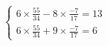\documentclass[preview]{standalone}
\begin{document}
\begin{align*}
\left\{ \begin{array}{cl} 6\times\frac{55}{34} - 8\times\frac{-7}{17} = 13 \\[1pt] 6\times\frac{55}{34} + 9\times\frac{-7}{17} = 6 \end{array} \right.
\end{align*}
\end{document}
